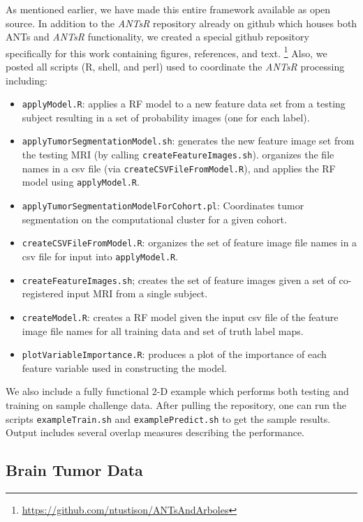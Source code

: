 As mentioned earlier, we have made this entire framework
available as open source.  In addition to the \textit{ANTsR} repository
already on github which houses both ANTs and \textit{ANTsR} functionality, 
we created a special github repository specifically for this work
containing figures, references, and text.%
\footnote{
\href{https://github.com/ntustison/ANTsAndArboles}{https://github.com/ntustison/ANTsAndArboles}
}
Also, we posted all
scripts (R, shell, and perl) used to coordinate the \textit{ANTsR} processing 
including:
\begin{itemize}
  \item {\tt applyModel.R}:  applies a RF model to a new 
  feature data set from a testing subject resulting in a set of probability
  images (one for each label).
  \item {\tt applyTumorSegmentationModel.sh}:  generates the new feature image set 
  from the testing MRI (by calling {\tt createFeatureImages.sh}).
  organizes the file names in a csv file (via {\tt createCSVFileFromModel.R}),
  and applies the RF model using {\tt applyModel.R}. 
  \item {\tt applyTumorSegmentationModelForCohort.pl}:  Coordinates tumor 
  segmentation on the computational cluster for a given cohort.
  \item {\tt createCSVFileFromModel.R}:  organizes the set of feature image
  file names in a csv file for input into {\tt applyModel.R}.
  \item {\tt createFeatureImages.sh};  creates the set of feature images given
  a set of co-registered input MRI from a single subject. 
  \item {\tt createModel.R}:  creates a RF model given the input csv 
  file of the feature image file names for all training data and set of truth
  label maps.
  \item {\tt plotVariableImportance.R}:  produces a plot of the importance 
   of each feature variable used 
  in constructing the model.
\end{itemize}
We also include a fully functional 2-D example which performs
both testing and training on sample challenge data.
After pulling the repository, one can run the scripts {\tt exampleTrain.sh}
and {\tt examplePredict.sh} to get the sample results.  Output includes
several overlap measures describing the performance.

\subsection{Brain Tumor Data}

